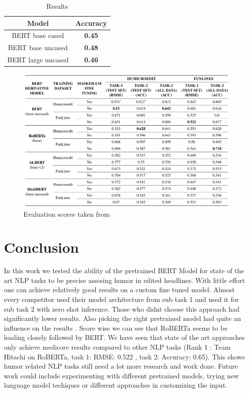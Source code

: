 \documentclass[11pt,a4paper,onecolumn,oneside,notitlepage]{article}
\begin{document}
		
		\begin{table}
			\begin{center}
				\begin{tabular}{|c|c|}
					\hline
					\textbf{Model} &  \textbf{Accuracy}\\
					\hline
					\hline
					BERT base cased & \textbf{0.45}\\
					\hline
					BERT base uncased & \textbf{0.48}\\
					\hline
					BERT large uncased & \textbf{0.46}\\
					\hline
				\end{tabular}
			\end{center}
			
			\caption{Results}\label{tab1}
		\end{table}				
		
	    \begin{figure}
	\begin{center}
		\includegraphics[width=1.0\linewidth]{eval_table.png}
	\end{center}
	
	\caption{Evaluation scores taken from \textcite{Bert1}}\label{fig4}
\end{figure}	
	\section{Conclusion}
	In this work we tested the ability of the pretrained BERT Model for state of the art NLP tasks to be precise assesing humor in edited headlines. With little effort one can achieve relatively good results on a custom fine tuned model.  Almost every competitor used their model architecture from sub task 1 and used it for sub task 2 with zero shot inference. Those who didnt choose this approach had significantly lower results. Also picking the right pretrained model had quite an influence on the results . Score wise we can see that RoBERTa seems to be leading closely followed by BERT.   We have seen that state of the art approaches  only achieve medicore results compared to other NLP tasks (Rank 1 : Team Hitachi on RoBERTa, task 1: RMSE: 0.522 , task 2: Accuracy: 0.65). This shows humor related NLP tasks still need a lot more research and work done.
	Future work could include experimenting with different pretrained models, trying new language model techiques or different approaches in customizing the input.
	\printbibliography
\end{document}
